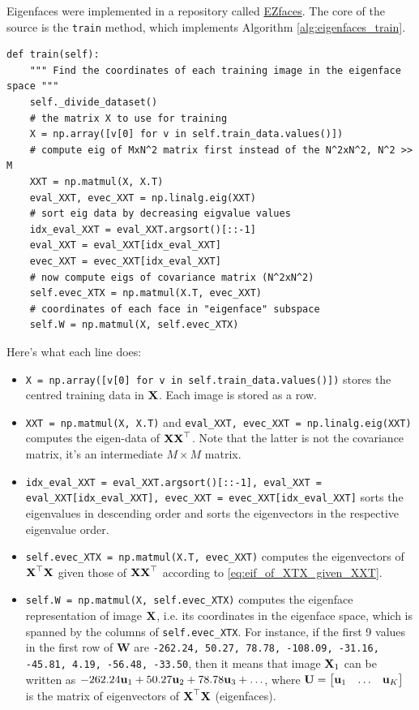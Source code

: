 \documentclass[a4paper]{article}
\begin{document}
Eigenfaces were implemented in a repository called \href{https://github.com/0xLeo/EZfaces}{EZfaces}. The core of the source is the \texttt{train} method, which implements Algorithm \ref{alg:eigenfaces_train}.
\begin{lstlisting}
def train(self):
	""" Find the coordinates of each training image in the eigenface space """
	self._divide_dataset()
	# the matrix X to use for training
	X = np.array([v[0] for v in self.train_data.values()])
	# compute eig of MxN^2 matrix first instead of the N^2xN^2, N^2 >> M
	XXT = np.matmul(X, X.T)
	eval_XXT, evec_XXT = np.linalg.eig(XXT)
	# sort eig data by decreasing eigvalue values
	idx_eval_XXT = eval_XXT.argsort()[::-1]
	eval_XXT = eval_XXT[idx_eval_XXT]
	evec_XXT = evec_XXT[idx_eval_XXT]
	# now compute eigs of covariance matrix (N^2xN^2)
	self.evec_XTX = np.matmul(X.T, evec_XXT)
	# coordinates of each face in "eigenface" subspace
	self.W = np.matmul(X, self.evec_XTX)

\end{lstlisting}
Here's what each line does:
\begin{itemize}
	\item \texttt{X = np.array([v[0] for v in self.train\_data.values()])} stores the centred training data in $\textbf{X}$. Each image is stored as a row.
	\item \texttt{XXT = np.matmul(X, X.T)} and \texttt{eval\_XXT, evec\_XXT = np.linalg.eig(XXT)} computes the eigen-data of $\textbf{X}\textbf{X}^{\top}$. Note that the latter is not the covariance matrix, it's an intermediate  $M\times M$ matrix.
	\item \texttt{idx\_eval\_XXT = eval\_XXT.argsort()[::-1], eval\_XXT = eval\_XXT[idx\_eval\_XXT], evec\_XXT = evec\_XXT[idx\_eval\_XXT]} sorts the eigenvalues in descending order and sorts the eigenvectors in the respective eigenvalue order. 
	\item \texttt{self.evec\_XTX = np.matmul(X.T, evec\_XXT)} computes the eigenvectors of $\textbf{X}^{\top}\textbf{X}$ given those of $\textbf{X}\textbf{X}^{\top}$ according to \eqref{eq:eif_of_XTX_given_XXT}.
	\item \texttt{self.W = np.matmul(X, self.evec\_XTX)} computes the eigenface representation of image $\textbf{X}$, i.e. its coordinates in the eigenface space, which is spanned by the columns of \texttt{self.evec\_XTX}. For instance, if the first 9 values in the first row of $\textbf{W}$ are \texttt{-262.24, 50.27, 78.78, -108.09, -31.16, -45.81, 4.19, -56.48, -33.50}, then it means that image $\textbf{X}_1$ can be written as $-262.24 \textbf{u}_1 + 50.27\textbf{u}_2 + 78.78\textbf{u}_3+ \ldots$, where $\textbf{U} = \begin{bmatrix}
		\textbf{u}_1 &\ldots & \textbf{u}_K	
	\end{bmatrix}$ is the matrix of eigenvectors of $\textbf{X}^{\top}\textbf{X}$ (eigenfaces).  
\end{itemize}
\end{document}
